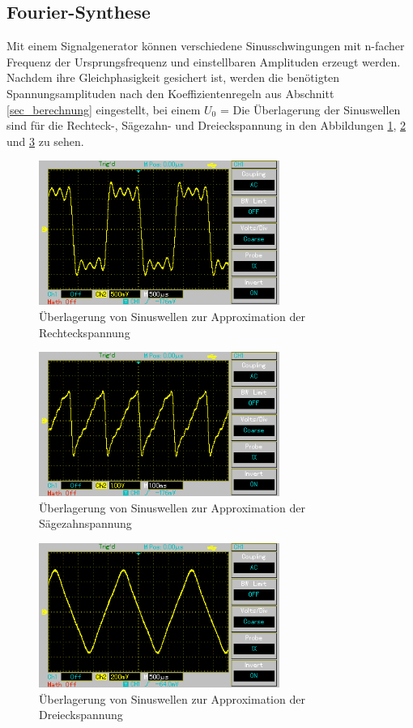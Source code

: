 \subsection{Fourier-Synthese}
\label{sec_synthese}
Mit einem Signalgenerator können verschiedene Sinusschwingungen mit n-facher Frequenz der Ursprungsfrequenz und einstellbaren Amplituden
erzeugt werden. Nachdem ihre Gleichphasigkeit gesichert ist, werden die benötigten Spannungsamplituden nach den Koeffizientenregeln aus
Abschnitt \ref{sec_berechnung} eingestellt, bei einem $U_0$ =  Die Überlagerung der Sinuswellen sind für die Rechteck-, Sägezahn- und Dreieckspannung 
in den Abbildungen \ref{pic_rechteckoszi}, \ref{pic_saegzahnoszi} und \ref{pic_dreieckoszi} zu sehen.

\begin{figure}[H]
 \includegraphics[width = 0.7\textwidth]{pics/rechteck.png}
 \caption{Überlagerung von Sinuswellen zur Approximation der Rechteckspannung}
 \label{pic_rechteckoszi}
\end{figure}

\begin{figure}[H]
 \includegraphics[width = 0.7\textwidth]{pics/saegezahn.png}
 \caption{Überlagerung von Sinuswellen zur Approximation der Sägezahnspannung}
 \label{pic_saegzahnoszi}
\end{figure}

\begin{figure}[H]
 \includegraphics[width = 0.7\textwidth]{pics/dreieck.png}
 \caption{Überlagerung von Sinuswellen zur Approximation der Dreieckspannung}
 \label{pic_dreieckoszi}
\end{figure}

